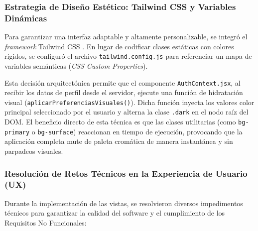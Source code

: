 \subsubsection{Estrategia de Diseño Estético: Tailwind CSS y Variables Dinámicas}

Para garantizar una interfaz adaptable y altamente personalizable, se integró el \textit{framework} Tailwind CSS \cite{bib:tailwind}. En lugar de codificar clases estáticas con colores rígidos, se configuró el archivo \texttt{tailwind.config.js} para referenciar un mapa de variables semánticas (\textit{CSS Custom Properties}).

Esta decisión arquitectónica permite que el componente \texttt{AuthContext.jsx}, al recibir los datos de perfil desde el servidor, ejecute una función de hidratación visual (\texttt{aplicarPreferenciasVisuales()}). Dicha función inyecta los valores color principal seleccionado por el usuario y alterna la clase \texttt{.dark} en el nodo raíz del DOM. El beneficio directo de esta técnica es que las clases utilitarias (como \texttt{bg-primary} o \texttt{bg-surface}) reaccionan en tiempo de ejecución, provocando que la aplicación completa mute de paleta cromática de manera instantánea y sin parpadeos visuales.

\subsubsection{Resolución de Retos Técnicos en la Experiencia de Usuario (UX)}

Durante la implementación de las vistas, se resolvieron diversos impedimentos técnicos para garantizar la calidad del software y el cumplimiento de los Requisitos No Funcionales:

